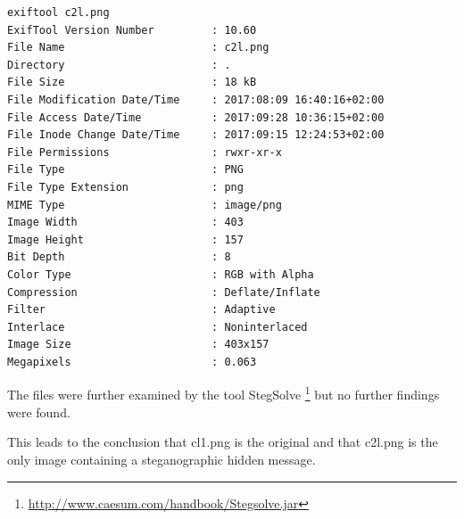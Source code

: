 \documentclass[a4paper,10pt,oneside]{article}
\begin{document}
\begin{lstlisting}[caption=ExifTool output for 'c2l.png']
exiftool c2l.png
ExifTool Version Number         : 10.60
File Name                       : c2l.png
Directory                       : .
File Size                       : 18 kB
File Modification Date/Time     : 2017:08:09 16:40:16+02:00
File Access Date/Time           : 2017:09:28 10:36:15+02:00
File Inode Change Date/Time     : 2017:09:15 12:24:53+02:00
File Permissions                : rwxr-xr-x
File Type                       : PNG
File Type Extension             : png
MIME Type                       : image/png
Image Width                     : 403
Image Height                    : 157
Bit Depth                       : 8
Color Type                      : RGB with Alpha
Compression                     : Deflate/Inflate
Filter                          : Adaptive
Interlace                       : Noninterlaced
Image Size                      : 403x157
Megapixels                      : 0.063
\end{lstlisting}
The files were further examined by the tool StegSolve \footnote{\url{http://www.caesum.com/handbook/Stegsolve.jar}} but no further findings were found.


This leads to the conclusion that cl1.png is the original and that c2l.png is the only image containing a steganographic hidden message.



%
%
\end{document}
